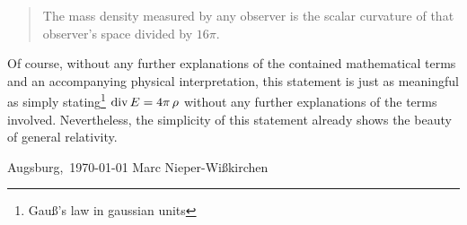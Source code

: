 \begin{quote}
	The mass density measured by any observer is the scalar curvature
	of that observer's space divided by $16\pi$.
\end{quote}

Of course, without any further explanations of the contained
mathematical terms and an accompanying physical interpretation, this
statement is just as meaningful as simply stating\footnote{Gau\ss 's law
in gaussian units} $\operatorname{div} E = 4 \pi \, \rho$ without any further
explanations of the terms involved. Nevertheless, the simplicity of this
statement already shows the beauty of general relativity.

\begin{center}
    Augsburg,~\today\hfill
    Marc Nieper-Wi\ss kirchen
\end{center}
